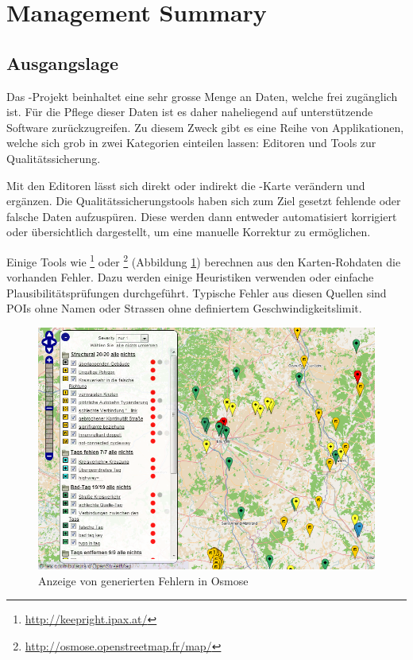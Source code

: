 \chapter*{Management Summary}
\thispagestyle{scrheadings}


\section*{Ausgangslage}
Das -Projekt beinhaltet eine sehr grosse Menge an Daten, welche frei zugänglich ist.
Für die Pflege dieser Daten ist es daher naheliegend auf unterstützende Software zurückzugreifen.
Zu diesem Zweck gibt es eine Reihe von Applikationen, welche sich grob in zwei Kategorien einteilen lassen:
Editoren und Tools zur Qualitätssicherung.

Mit den Editoren lässt sich direkt oder indirekt die -Karte verändern und ergänzen.
Die Qualitätssicherungstools haben sich zum Ziel gesetzt fehlende oder falsche Daten aufzuspüren.
Diese werden dann entweder automatisiert korrigiert oder übersichtlich dargestellt, um eine manuelle Korrektur zu ermöglichen.

Einige Tools wie \footnote{\url{http://keepright.ipax.at/}} oder \footnote{\url{http://osmose.openstreetmap.fr/map/}} (Abbildung \ref{image-osmose-screenshot}) berechnen aus den Karten-Rohdaten die vorhanden Fehler.
Dazu werden einige Heuristiken verwenden oder einfache Plausibilitätsprüfungen durchgeführt.
Typische Fehler aus diesen Quellen sind \glspl{POI} ohne Namen oder Strassen ohne definiertem Geschwindigkeitslimit.

\begin{figure}[H]
	\centering
	\includegraphics[scale=0.4]{images/managementsummary/osmose-screenshot}
	\caption{Anzeige von generierten Fehlern in Osmose}
	\label{image-osmose-screenshot}
\end{figure}

